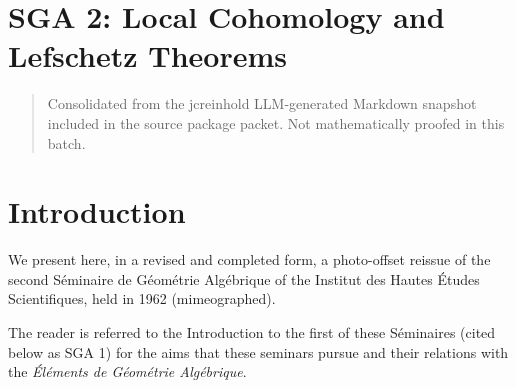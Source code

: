 \documentclass[
]{article}
\author{}
\date{}
\begin{document}
\section{SGA 2: Local Cohomology and Lefschetz
Theorems}\label{sga-2-local-cohomology-and-lefschetz-theorems}

\begin{quote}
Consolidated from the jcreinhold LLM-generated Markdown snapshot
included in the source package packet. Not mathematically proofed in this
batch.
\end{quote}

\section{Introduction}\label{introduction}

We present here, in a revised and completed form, a photo-offset reissue
of the second Séminaire de Géométrie Algébrique of the Institut des
Hautes Études Scientifiques, held in 1962 (mimeographed).

The reader is referred to the Introduction to the first of these
Séminaires (cited below as SGA 1) for the aims that these seminars
pursue and their relations with the \emph{Éléments de Géométrie
Algébrique}.
\end{document}

